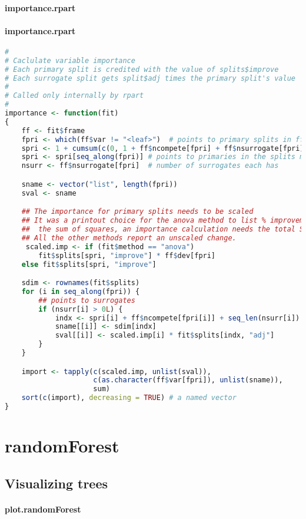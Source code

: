 \documentclass[10pt,a4paper]{article}
\begin{document}
\paragraph*{importance.rpart}
\paragraph{importance.rpart}
\begin{lstlisting}[language=R]
#
# Caclulate variable importance
# Each primary split is credited with the value of splits$improve
# Each surrogate split gets split$adj times the primary split's value
#
# Called only internally by rpart
#
importance <- function(fit)
{
    ff <- fit$frame
    fpri <- which(ff$var != "<leaf>")  # points to primary splits in ff
    spri <- 1 + cumsum(c(0, 1 + ff$ncompete[fpri] + ff$nsurrogate[fpri]))
    spri <- spri[seq_along(fpri)] # points to primaries in the splits matrix
    nsurr <- ff$nsurrogate[fpri]  # number of surrogates each has

    sname <- vector("list", length(fpri))
    sval <- sname

    ## The importance for primary splits needs to be scaled
    ## It was a printout choice for the anova method to list % improvement in
    ##  the sum of squares, an importance calculation needs the total SS.
    ## All the other methods report an unscaled change.
     scaled.imp <- if (fit$method == "anova")
        fit$splits[spri, "improve"] * ff$dev[fpri]
    else fit$splits[spri, "improve"]

    sdim <- rownames(fit$splits)
    for (i in seq_along(fpri)) {
        ## points to surrogates
        if (nsurr[i] > 0L) {
            indx <- spri[i] + ff$ncompete[fpri[i]] + seq_len(nsurr[i])
            sname[[i]] <- sdim[indx]
            sval[[i]] <- scaled.imp[i] * fit$splits[indx, "adj"]
        }
    }

    import <- tapply(c(scaled.imp, unlist(sval)),
                     c(as.character(ff$var[fpri]), unlist(sname)),
                     sum)
    sort(c(import), decreasing = TRUE) # a named vector
}
\end{lstlisting}         
\section{randomForest}
\subsection{Visualizing trees}
\bigskip
\paragraph*{plot.randomForest}
\end{document}
